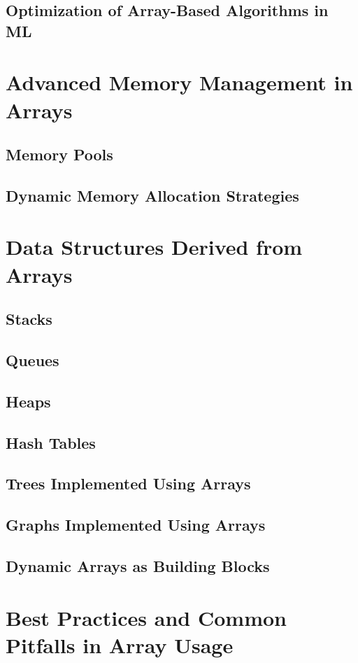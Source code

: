 \documentclass[12pt, oneside]{book}
\begin{document}
\section{Optimization of Array-Based Algorithms in ML}

\chapter{Advanced Memory Management in Arrays}
\section{Memory Pools}
\section{Dynamic Memory Allocation Strategies}

\chapter{Data Structures Derived from Arrays}
\section{Stacks}
\section{Queues}
\section{Heaps}
\section{Hash Tables}
\section{Trees Implemented Using Arrays}
\section{Graphs Implemented Using Arrays}
\section{Dynamic Arrays as Building Blocks}

\chapter{Best Practices and Common Pitfalls in Array Usage}
\end{document}
